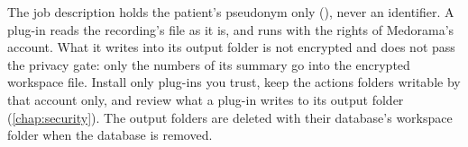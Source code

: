 \begin{phibox}
The job description holds the patient's pseudonym only (), never an identifier.
A plug-in reads the recording's file as it is, and runs with the rights of Medorama's account.
What it writes into its output folder is not encrypted and does not pass the privacy gate: only
the numbers of its summary go into the encrypted workspace file. Install only plug-ins you
trust, keep the actions folders writable by that account only, and review what a plug-in writes
to its output folder (\cref{chap:security}). The output folders are deleted with their
database's workspace folder when the database is removed.
\end{phibox}
